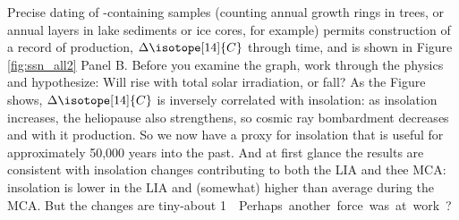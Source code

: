 Precise dating of -containing samples (counting annual growth rings in trees, or annual layers in lake sediments or ice cores, for example) permits construction of a record of  production, $\Delta\isotope[14]{C}$ through time, and is shown in Figure \ref{fig:ssn_all2} Panel B. Before you examine the graph, work through the physics and hypothesize: Will  rise with total solar irradiation, or fall? As the Figure shows, $\Delta\isotope[14]{C}$ is inversely correlated with insolation: as insolation increases, the heliopause also strengthens, so cosmic ray bombardment decreases and with it  production. So we now have a proxy for insolation that is useful for approximately 50,000 years into the past. And at first glance the results are consistent with insolation changes contributing to both the LIA and thee MCA: insolation is lower in the LIA and (somewhat) higher than average during the MCA. But the changes are tiny-about \SI{1}{\watt\per\metre\square}. Perhaps another force was at work? 

